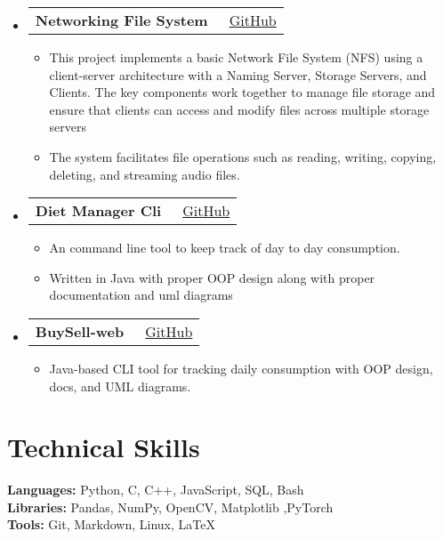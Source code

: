 \documentclass[a4paper,10pt]{article}
\makeatletter
\newcommand{\resumeItem}[1]{\item[\textcolor{bulletcolor}{\textbullet}] \small{#1}}
\newcommand{\resumeProjectHeading}[2]{
    \item
    \begin{tabular*}{0.97\textwidth}{l@{\extracolsep{\fill}}r}
        \textbf{#1} & {\small #2} \\
    \end{tabular*}\vspace{-7pt}
}
\makeatother
\begin{document}
\begin{itemize}[leftmargin=0.15in, label={}]
        
    \resumeProjectHeading
        {\textbf{Networking File System}}{{\small\faGithub}\ \href{https://github.com/mayank3135432/Networking_File_System_Dummy}{GitHub}}
        \begin{itemize}[leftmargin=0.15in]
            \resumeItem{This project implements a basic Network File System (NFS) using a client-server architecture with a Naming Server, Storage Servers, and Clients. The key components work together to manage file storage and ensure that clients can access and modify files across multiple storage servers}
            \resumeItem{The system facilitates file operations such as reading, writing, copying, deleting, and streaming audio files.}
        \end{itemize}

        
    \resumeProjectHeading
        {\textbf{Diet Manager Cli}}{{\small\faGithub}\ \href{https://github.com/mayank3135432/diet_manager-cli}{GitHub}}
        \begin{itemize}[leftmargin=0.15in]
            \resumeItem{An command line tool to keep track of day to day consumption.}
            \resumeItem{Written in Java with proper OOP design along with proper documentation and uml diagrams}
        \end{itemize}
        
    \resumeProjectHeading
        {\textbf{BuySell-web}}{{\small\faGithub}\ \href{https://github.com/mayank3135432/BUYSELL-web}{GitHub}}
        \begin{itemize}[leftmargin=0.15in]
            \resumeItem{Java-based CLI tool for tracking daily consumption with OOP design, docs, and UML diagrams.}
        \end{itemize}

\end{itemize}

\section{Technical Skills}
\begin{multicols}{2}
\textbf{}
\textbf{Languages:} Python, C, C++, JavaScript, SQL, Bash \\
\textbf{Libraries:} Pandas, NumPy, OpenCV, Matplotlib ,PyTorch \\
\textbf{Tools:} Git, Markdown, Linux, LaTeX \\
\end{multicols}

\end{document}
